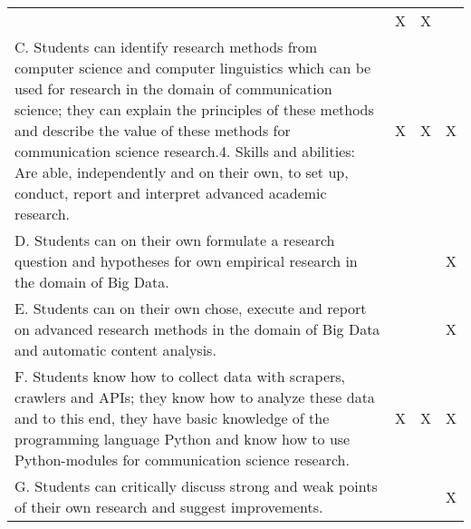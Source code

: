 \documentclass[a4paper,12pt]{report}
\begin{document}
\begin{table}[]
{\begin{tabular}{p{8cm}p{2cm}p{2cm}p{2cm}}
& X                                                                                            & X                       &                          \\
C. Students can identify research methods from computer science and computer linguistics which can be used for research in the domain of communication science; they can explain the principles of these methods and describe the value of these methods for communication science research.4. Skills and abilities: Are able, independently and on their own, to set up, conduct, report and interpret advanced academic research.
                                                                & X                                                                                            & X                       & X                        \\
D. Students can on their own formulate a research question and hypotheses for own empirical research in the domain of Big Data.                                                                                                                                                                                                     &                                                                                              &                         & X                        \\
E. Students can on their own chose, execute and report on advanced research methods in the domain of Big Data and automatic content analysis.                                                                                                                                                                                             &                                                                                              &                         & X                        \\
F. Students know how to collect data with scrapers, crawlers and APIs; they know how to analyze these data and to this end, they have basic knowledge of the programming language Python and know how to use Python-modules for communication science research.                                                                         & X                                                                                            & X                       & X                        \\
G. Students can critically discuss  strong and weak points of their own research and suggest improvements.                                                                                                                                                                                                                                         &                                                                                              &                         & X                        \\

\end{tabular}}
\end{table}
\end{document}
